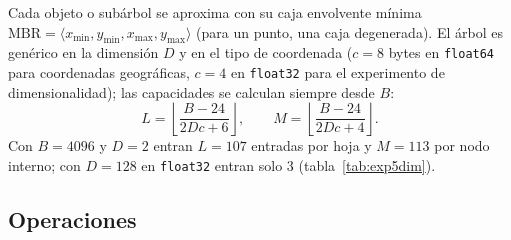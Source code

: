 \documentclass[11pt,a4paper]{article}
\newcommand{\code}[1]{\texttt{#1}}
\begin{document}
Cada objeto o subárbol se aproxima con su caja envolvente mínima $\text{MBR}=\langle x_{\min},
y_{\min}, x_{\max}, y_{\max}\rangle$ (para un punto, una caja degenerada). El árbol es genérico en la
dimensión $D$ y en el tipo de coordenada ($c=8$ bytes en \code{float64} para coordenadas geográficas,
$c=4$ en \code{float32} para el experimento de dimensionalidad); las capacidades se calculan siempre
desde $B$:
\[
L=\left\lfloor\frac{B-24}{2Dc+6}\right\rfloor,\qquad
M=\left\lfloor\frac{B-24}{2Dc+4}\right\rfloor .
\]
Con $B=4096$ y $D=2$ entran $L=107$ entradas por hoja y $M=113$ por nodo interno; con $D=128$ en
\code{float32} entran solo 3 (tabla~\ref{tab:exp5dim}).

\subsection{Operaciones}
\end{document}
